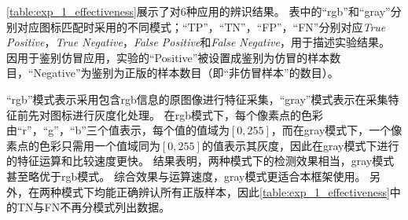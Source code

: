 \autoref{table:exp_1_effectiveness}展示了\mytool 对6种应用的辨识结果。
表中的``rgb''和``gray''分别对应图标匹配时采用的不同模式；``TP''，``TN''，``FP''，``FN''分别对应\textit{True Positive}，\textit{True Negative}，\textit{False Positive}和\textit{False Negative}，用于描述实验结果。
因\mytool 用于鉴别仿冒应用，实验的``Positive''被设置成鉴别为仿冒的样本数目，``Negative''为鉴别为正版的样本数目（即``非仿冒样本''的数目）。

``rgb''模式表示采用包含rgb信息的原图像进行特征采集，``gray''模式表示在采集特征前先对图标进行灰度化处理。
在rgb模式下，每个像素点的色彩由``r''，``g''，``b''三个值表示，每个值的值域为$[0, 255]$，而在gray模式下，一个像素点的色彩只需用一个值域同为$[0, 255]$的值表示其灰度，因此在gray模式下进行的特征运算和比较速度更快。
结果表明，两种模式下的检测效果相当，gray模式甚至略优于rgb模式。
综合效果与运算速度，gray模式更适合本框架使用。
另外，\mytool 在两种模式下均能正确辨认所有正版样本，因此\autoref{table:exp_1_effectiveness}中的TN与FN不再分模式列出数据。

